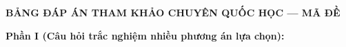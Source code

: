 
\newpage
\begin{center} \textbf{BẢNG ĐÁP ÁN THAM KHẢO CHUYÊN QUỐC HỌC --- MÃ ĐỀ \thedeso} \end{center}

\noindent \textbf{Phần I (Câu hỏi trắc nghiệm nhiều phương án lựa chọn):}